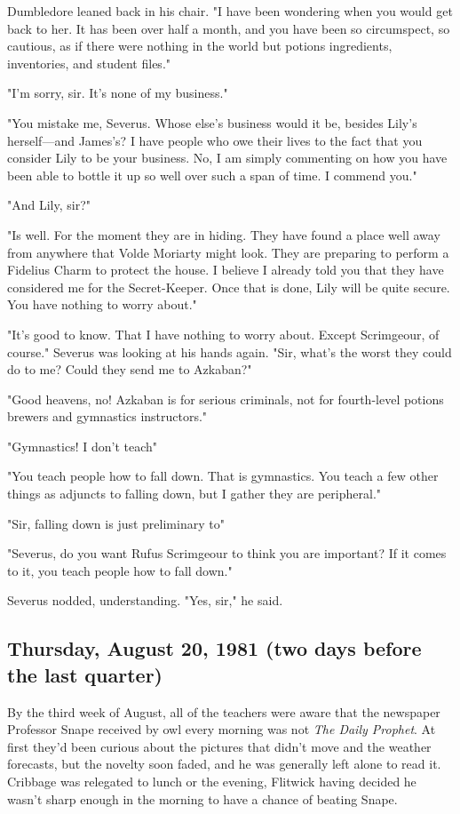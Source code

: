 Dumbledore leaned back in his chair. "I have been wondering when you would get back to her. It has been over half a month, and you have been so circumspect, so cautious, as if there were nothing in the world but potions ingredients, inventories, and student files."

"I'm sorry, sir. It's none of my business."

"You mistake me, Severus. Whose else's business would it be, besides Lily's herself—and James's? I have people who owe their lives to the fact that you consider Lily to be your business. No, I am simply commenting on how you have been able to bottle it up so well over such a span of time. I commend you."

"And Lily, sir?"

"Is well. For the moment they are in hiding. They have found a place well away from anywhere that Volde{\el} Moriarty might look. They are preparing to perform a Fidelius Charm to protect the house. I believe I already told you that they have considered me for the Secret-Keeper. Once that is done, Lily will be quite secure. You have nothing to worry about."

"It's good to know. That I have nothing to worry about. Except Scrimgeour, of course." Severus was looking at his hands again. "Sir, what's the worst they could do to me? Could they send me to Azkaban?"

"Good heavens, no! Azkaban is for serious criminals, not for fourth-level potions brewers and gymnastics instructors."

"Gymnastics! I don't teach{\el}"

"You teach people how to fall down. That is gymnastics. You teach a few other things as adjuncts to falling down, but I gather they are peripheral."

"Sir, falling down is just preliminary to{\el}"

"Severus, do you want Rufus Scrimgeour to think you are important? If it comes to it, you teach people how to fall down."

Severus nodded, understanding. "Yes, sir," he said.

\subsection{Thursday, August 20, 1981 (two days before the last quarter)}

By the third week of August, all of the teachers were aware that the newspaper Professor Snape received by owl every morning was not \emph{The Daily Prophet}. At first they'd been curious about the pictures that didn't move and the weather forecasts, but the novelty soon faded, and he was generally left alone to read it. Cribbage was relegated to lunch or the evening, Flitwick having decided he wasn't sharp enough in the morning to have a chance of beating Snape.

